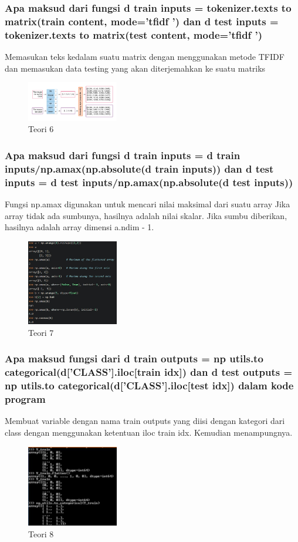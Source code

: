 \subsubsection{Apa maksud dari fungsi d train inputs = tokenizer.texts to matrix(train content, mode=’tfidf ’) dan d test inputs = tokenizer.texts to matrix(test content, mode=’tfidf ’)}
\hfill\break
Memasukan teks kedalam suatu matrix dengan menggunakan metode TFIDF dan memasukan data testing yang akan diterjemahkan ke suatu matriks
\begin{figure}[H]
\centering
	\includegraphics[width=4cm]{figures/1174079/7/EmbeddingLayer.png}
\caption{Teori 6}
\end{figure}

\subsubsection{Apa maksud dari fungsi d train inputs = d train inputs/np.amax(np.absolute(d train inputs)) dan d test inputs = d test inputs/np.amax(np.absolute(d test inputs))}
\hfill\break
Fungsi np.amax digunakan untuk mencari nilai maksimal dari suatu array Jika array tidak ada sumbunya, hasilnya adalah nilai skalar. Jika sumbu diberikan, hasilnya adalah array dimensi a.ndim - 1.
\begin{figure}[H]
\centering
	\includegraphics[width=4cm]{figures/1174079/7/7.jpg}
\caption{Teori 7}
\end{figure}

\subsubsection{Apa maksud fungsi dari d train outputs = np utils.to categorical(d[’CLASS’].iloc[train idx]) dan d test outputs = np utils.to categorical(d[’CLASS’].iloc[test idx]) dalam kode program}
\hfill\break
Membuat variable dengan nama train outputs yang diisi dengan kategori dari class dengan menggunakan ketentuan iloc train idx. Kemudian menampungnya.
\begin{figure}[H]
\centering
	\includegraphics[width=4cm]{figures/1174079/7/8.jpg}
\caption{Teori 8}
\end{figure}

